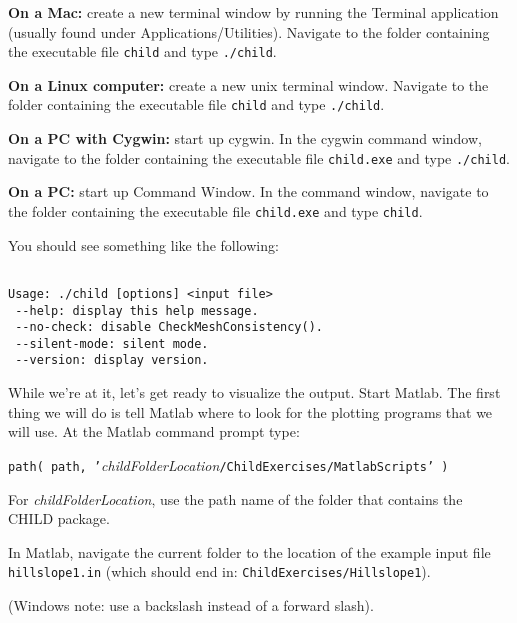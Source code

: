 \documentclass[12pt]{amsart}
\begin{document}
{\bf On a Mac:} create a new terminal window by running the Terminal application (usually found under Applications/Utilities). Navigate to the folder containing the executable file {\tt child} and type {\tt ./child}.

{\bf On a Linux computer:} create a new unix terminal window. Navigate to the folder containing the executable file {\tt child} and type {\tt ./child}.

{\bf On a PC with Cygwin:} start up cygwin. In the cygwin command window, navigate to the folder containing the executable file {\tt child.exe} and type {\tt ./child}.

{\bf On a PC:} start up Command Window. In the command window, navigate to the folder containing the executable file {\tt child.exe} and type {\tt child}.

You should see something like the following:
\begin{verbatim}

Usage: ./child [options] <input file>
 --help: display this help message.
 --no-check: disable CheckMeshConsistency().
 --silent-mode: silent mode.
 --version: display version.

\end{verbatim}

While we're at it, let's get ready to visualize the output. Start Matlab. The first thing we will do is tell Matlab where to look for the plotting programs that we will use. At the Matlab command prompt type:

{\tt path( path, '}{\em childFolderLocation}{\tt /ChildExercises/MatlabScripts' )}

\noindent For {\em childFolderLocation}, use the path name of the folder that contains the CHILD package.

In Matlab, navigate the current folder to the location of the example input file {\tt hillslope1.in} (which should end in: {\tt ChildExercises/Hillslope1}).

(Windows note: use a backslash instead of a forward slash).
\end{document}
